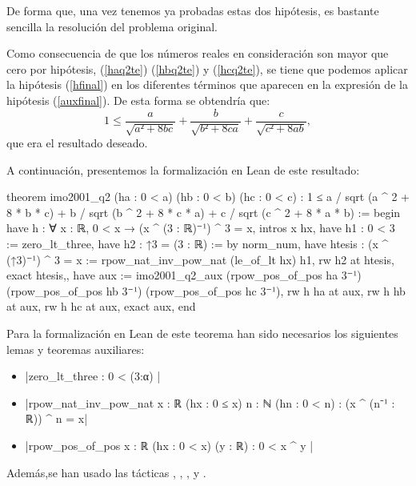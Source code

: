 \begin{demostracion}
  De forma que, una vez tenemos ya probadas estas dos hipótesis, es bastante
  sencilla la resolución del problema original.

  Como consecuencia de que los números reales en consideración son mayor que
  cero por hipótesis, (\ref{haq2te}) (\ref{hbq2te}) y (\ref{hcq2te}), se
  tiene que podemos aplicar la hipótesis (\ref{hfinal}) en los diferentes
  términos que aparecen en la expresión de la hipótesis (\ref{auxfinal}).
  De esta forma se obtendría que:
  \begin{equation}
    1 ≤ \frac{a}{\sqrt{a²+8bc}}+\frac{b}{\sqrt{b²+8ca}}+
        \frac{c}{\sqrt{c²+8ab}},
  \end{equation}
  que era el resultado deseado.
\end{demostracion}

A continuación, presentemos la formalización en Lean de este resultado:

\begin{leancode}
theorem imo2001_q2
  (ha : 0 < a)
  (hb : 0 < b)
  (hc : 0 < c)
  : 1 ≤ a / sqrt (a ^ 2 + 8 * b * c) +
        b / sqrt (b ^ 2 + 8 * c * a) +
        c / sqrt (c ^ 2 + 8 * a * b) :=
begin
  have h : ∀ {x : ℝ}, 0 < x → (x ^ (3 : ℝ)⁻¹) ^ 3 = x,
    { intros x hx,
      have h1 : 0 < 3 :=
        zero_lt_three,
      have h2 : ↑3 = (3 : ℝ) :=
        by norm_num,
      have htesis : (x ^ (↑3)⁻¹) ^ 3 = x :=
        rpow_nat_inv_pow_nat (le_of_lt hx) h1,
      rw h2 at htesis,
      exact htesis,},
  have aux :=
    imo2001_q2_aux (rpow_pos_of_pos ha 3⁻¹)
                   (rpow_pos_of_pos hb 3⁻¹)
                   (rpow_pos_of_pos hc 3⁻¹),
  rw h ha at aux,
  rw h hb at aux,
  rw h hc at aux,
  exact aux,
end
\end{leancode}

Para la formalización en Lean de este teorema han sido necesarios los
siguientes lemas y teoremas auxiliares:
\begin{itemize}
\item {}|zero_lt_three : 0 < (3:α) |
\item {}|rpow_nat_inv_pow_nat {x : ℝ} (hx : 0 ≤ x) {n : ℕ} (hn : 0 < n) :
  (x ^ (n⁻¹ : ℝ)) ^ n = x|
\item {}|rpow_pos_of_pos {x : ℝ} (hx : 0 < x) (y : ℝ) : 0 < x ^ y |
\end{itemize}



Además,se han usado las tácticas
,
,
,
 y
.
